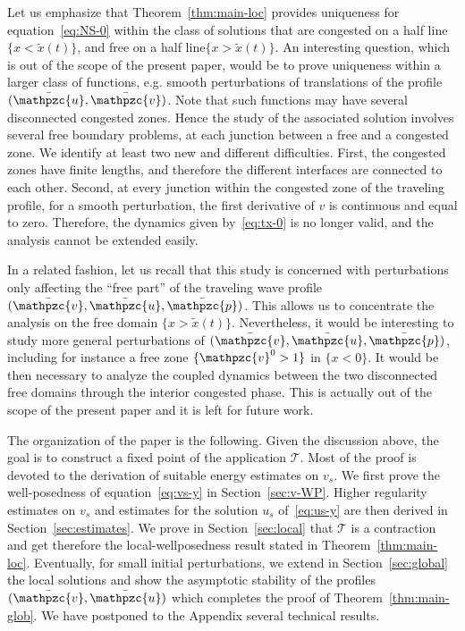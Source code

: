 \documentclass[AHL,Unicode,longabstracts,published]{cedram}
\newcommand{\bv}{\bar{\mathpzc{v}}}
\newcommand{\bu}{\bar{\mathpzc{u}}}
\newcommand{\bp}{\bar{\mathpzc{p}}}
\newcommand{\cT}{\mathcal T}
\newcommand{\tv}{\mathpzc{v}}
\newcommand{\tx}{\widetilde{x}}
\newcommand{\tx}{\widetilde{x}}
\begin{document}
\begin{rema}
Let us emphasize that Theorem~\ref{thm:main-loc} provides uniqueness for equation~\eqref{eq:NS-0} within the class of solutions that are congested on a half line $\{x<\tx(t)\}$, and free on a half line\linebreak $\{x>\tx(t)\}$. An interesting question, which is out of the scope of the present paper, would be to prove uniqueness within a larger class of functions, e.g. smooth perturbations of translations of the profile $(\bu, \bv)$. Note that such functions may have several disconnected congested zones. Hence the study of the associated solution involves several free boundary problems, at each junction between a free and a congested zone. We identify at least two new and different difficulties. First, the congested zones have finite lengths, and therefore the different interfaces are connected to each other. Second, at every junction within the congested zone of the traveling profile, for a smooth perturbation, the first derivative of $v$ is continuous and equal to zero. Therefore, the dynamics given by~\eqref{eq:tx-0} is no longer valid, and the analysis cannot be extended easily. 

In a related fashion, let us recall that this study is concerned with perturbations only affecting the ``free part'' of the traveling wave profile $(\bv,\bu,\bp)$. This allows us to concentrate the analysis on the free domain $\{ x>\tx(t)\}$. Nevertheless, it would be interesting to study more general perturbations of $(\bv,\bu,\bp)$, including for instance a free zone $\{\tv^0 > 1\}$ in $\{x < 0\}$. It would be then necessary to analyze the coupled dynamics between the two disconnected free domains through the interior congested phase. This is actually out of the scope of the present paper and it is left for future work.
\end{rema}


The organization of the paper is the following. Given the discussion above, the goal is to construct a fixed point of the application $\cT$. Most of the proof is devoted to the derivation of suitable energy estimates on $v_s$. We first prove the well-posedness of equation~\eqref{eq:vs-y} in Section~\ref{sec:v-WP}. Higher regularity estimates on $v_s$ and estimates for the solution $u_s$ of~\eqref{eq:us-y} are then derived in Section~\ref{sec:estimates}. We prove in Section~\ref{sec:local} that $\cT$ is a contraction and get therefore the local-wellposedness result stated in Theorem~\ref{thm:main-loc}. Eventually, for small initial perturbations, we extend in Section~\ref{sec:global} the local solutions and show the asymptotic stability of the profiles $(\bv,\bu)$ which completes the proof of Theorem~\ref{thm:main-glob}. We have postponed to the Appendix several technical results.
\end{document}
